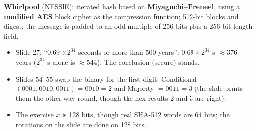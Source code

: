 \textbf{Whirlpool} (NESSIE): iterated hash based on \textbf{Miyaguchi--Preneel}, using a \textbf{modified AES} block cipher as the compression function; 512-bit blocks and digest; the message is padded to an odd multiple of 256 bits plus a 256-bit length field.

\begin{fixbox}
\begin{itemize}
  \item Slide 27: ``0.69 $\times 2^{34}$ seconds or more than 500 years'': $0.69 \times 2^{34}$ s $\approx 376$ years ($2^{34}$ s alone is $\approx 544$). The conclusion (secure) stands.
  \item Slides 54--55 swap the binary for the first digit: Conditional$(0001, 0010, 0011) = 0010 = 2$ and Majority $= 0011 = 3$ (the slide prints them the other way round, though the hex results 2 and 3 are right).
  \item The exercise $x$ is 128 bits, though real SHA-512 words are 64 bits; the rotations on the slide are done on 128 bits.
\end{itemize}
\end{fixbox}
